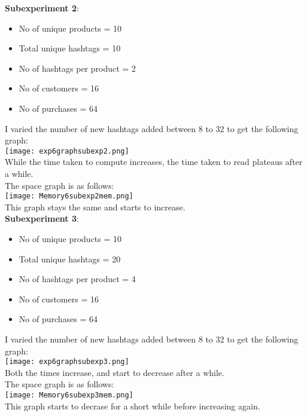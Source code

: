 \documentclass[12pt]{article}
\begin{document}
\textbf{Subexperiment 2}:\\
\begin{itemize}
    \item No of unique products = 10
    \item Total unique hashtags = 10
    \item No of hashtags per product = 2
    \item No of customers = 16
    \item No of purchases = 64
\end{itemize}
I varied the number of new hashtags added between 8 to 32 to get the following graph:\\
\texttt{[image: exp6graphsubexp2.png]}\\
While the time taken to compute increases, the time taken to read plateaus after a while.\\
The space graph is as follows:\\
\texttt{[image: Memory6subexp2mem.png]}\\
This graph stays the same and starts to increase.\\

\textbf{Subexperiment 3}:\\
\begin{itemize}
    \item No of unique products = 10
    \item Total unique hashtags = 20
    \item No of hashtags per product = 4
    \item No of customers = 16
    \item No of purchases = 64
\end{itemize}
I varied the number of new hashtags added between 8 to 32 to get the following graph:\\
\texttt{[image: exp6graphsubexp3.png]}\\
Both the times increase, and start to decrease after a while.\\
The space graph is as follows:\\
\texttt{[image: Memory6subexp3mem.png]}\\
This graph starts to decrase for a short while before increasing again.\\
\end{document}
